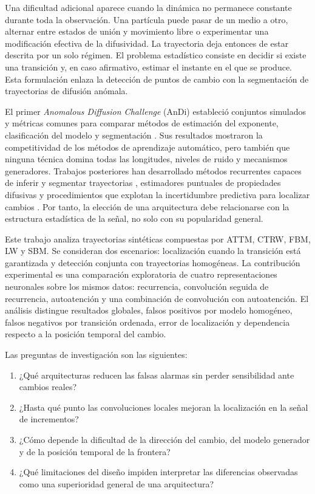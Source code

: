 \documentclass[a4paper,12pt]{article}
\begin{document}
Una dificultad adicional aparece cuando la dinámica no permanece constante durante toda la observación. Una partícula puede pasar de un medio a otro, alternar entre estados de unión y movimiento libre o experimentar una modificación efectiva de la difusividad. La trayectoria deja entonces de estar descrita por un solo régimen. El problema estadístico consiste en decidir si existe una transición y, en caso afirmativo, estimar el instante en el que se produce. Esta formulación enlaza la detección de puntos de cambio con la segmentación de trayectorias de difusión anómala.

El primer \emph{Anomalous Diffusion Challenge} (AnDi) estableció conjuntos simulados y métricas comunes para comparar métodos de estimación del exponente, clasificación del modelo y segmentación \cite{munozgil2021objective}. Sus resultados mostraron la competitividad de los métodos de aprendizaje automático, pero también que ninguna técnica domina todas las longitudes, niveles de ruido y mecanismos generadores. Trabajos posteriores han desarrollado métodos recurrentes capaces de inferir y segmentar trayectorias \cite{bo2019measurement,argun2021classification}, estimadores puntuales de propiedades difusivas \cite{requena2023pointwise} y procedimientos que explotan la incertidumbre predictiva para localizar cambios \cite{seckler2024changepoint}. Por tanto, la elección de una arquitectura debe relacionarse con la estructura estadística de la señal, no solo con su popularidad general.

Este trabajo analiza trayectorias sintéticas compuestas por ATTM, CTRW, FBM, LW y SBM. Se consideran dos escenarios: localización cuando la transición está garantizada y detección conjunta con trayectorias homogéneas. La contribución experimental es una comparación exploratoria de cuatro representaciones neuronales sobre los mismos datos: recurrencia, convolución seguida de recurrencia, autoatención y una combinación de convolución con autoatención. El análisis distingue resultados globales, falsos positivos por modelo homogéneo, falsos negativos por transición ordenada, error de localización y dependencia respecto a la posición temporal del cambio.

Las preguntas de investigación son las siguientes:
\begin{enumerate}
  \item ¿Qué arquitecturas reducen las falsas alarmas sin perder sensibilidad ante cambios reales?
  \item ¿Hasta qué punto las convoluciones locales mejoran la localización en la señal de incrementos?
  \item ¿Cómo depende la dificultad de la dirección del cambio, del modelo generador y de la posición temporal de la frontera?
  \item ¿Qué limitaciones del diseño impiden interpretar las diferencias observadas como una superioridad general de una arquitectura?
\end{enumerate}
\end{document}
